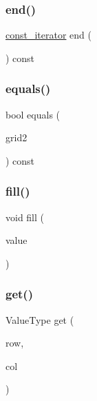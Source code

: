 \mbox{\label{classGrid_accf9a4bd0c34d4a5f6a7dab66ea10cdc}} 
\subsubsection{\texorpdfstring{end()}{end()}\hspace{0.1cm}{\footnotesize\ttfamily [2/2]}}
{\footnotesize\ttfamily \mbox{\hyperlink{classGrid_aab30a5ff3fa2aff5b1f8b875438a3609}{const\+\_\+iterator}} end (\begin{DoxyParamCaption}{ }\end{DoxyParamCaption}) const\hspace{0.3cm}{\ttfamily [inline]}}

\mbox{\label{classGrid_a9619d603ca957ce2be5b13198af5ee02}} 
\subsubsection{\texorpdfstring{equals()}{equals()}}
{\footnotesize\ttfamily bool equals (\begin{DoxyParamCaption}\item[{const \mbox{\hyperlink{classGrid}{Grid}}$<$ Value\+Type $>$ \&}]{grid2 }\end{DoxyParamCaption}) const}

\mbox{\label{classGrid_ac8f8ff1a5d0997596cbedbc2162e4649}} 
\subsubsection{\texorpdfstring{fill()}{fill()}}
{\footnotesize\ttfamily void fill (\begin{DoxyParamCaption}\item[{const Value\+Type \&}]{value }\end{DoxyParamCaption})}

\mbox{\label{classGrid_a49fcb88bae29483f4cb0858f29f6384e}} 
\subsubsection{\texorpdfstring{get()}{get()}\hspace{0.1cm}{\footnotesize\ttfamily [1/4]}}
{\footnotesize\ttfamily Value\+Type get (\begin{DoxyParamCaption}\item[{int}]{row,  }\item[{int}]{col }\end{DoxyParamCaption})}

